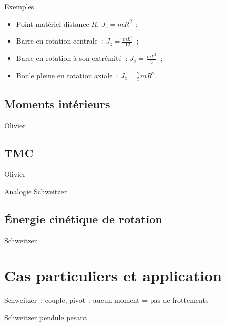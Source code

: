 \documentclass[../main/main.tex]{subfiles}
\begin{document}
\begin{rexem}{Exemples}
    \begin{itemize}
        \item Point matériel distance $R$, $J_z = mR^2$~;
        \item Barre en rotation centrale~: $J_z = \frac{mL^2}{12}$~;
        \item Barre en rotation à son extrémité~: $J_z = \frac{mL^2}{3}$~;
        \item Boule pleine en rotation axiale~: $J_z = \frac{2}{5}mR^2$.
    \end{itemize}
\end{rexem}
\subsection{Moments intérieurs}
Olivier

\subsection{TMC}
Olivier

Analogie Schweitzer

\subsection{Énergie cinétique de rotation}
Schweitzer

\section{Cas particuliers et application}
Schweitzer~: couple, pivot~; aucun moment = pas de frottements

Schweitzer pendule pesant
\end{document}
